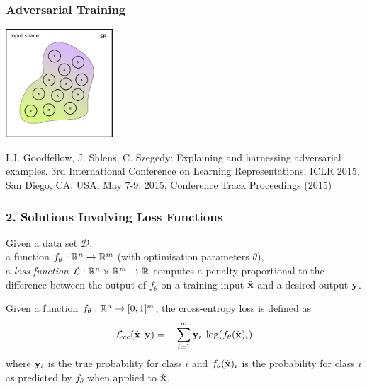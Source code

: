 \documentclass[t,compress,aspectratio=169]{beamer}
\begin{document}
 \begin{frame}[fragile]
  \frametitle{Adversarial Training}


  \vspace{-1em}

\begin{center}

  \includegraphics[width=4cm]{img/SR-vs-CR-3.png}

  \end{center}
   {\scriptsize
   \begin{thebibliography}{99}
        \beamertemplatearticlebibitems
I.J. Goodfellow, J. Shlens, C. Szegedy: Explaining and harnessing adversarial examples. 3rd International Conference on Learning Representations,
ICLR 2015, San Diego, CA, USA, May 7-9, 2015, Conference Track Proceedings (2015)
 \end{thebibliography}}
 \end{frame}


\begin{frame}
  \frametitle{2. Solutions Involving Loss Functions}
    \vspace{-2em}

Given a data set $\mathcal{D} $,\\  a function  ${f_{\theta}: {\mathbb R}^n \rightarrow {\mathbb R}^m}$ (with optimisation parameters $\theta$),\\
	a \emph{loss function} $\mathcal{L}: {\mathbb R}^n \times {\mathbb R}^m \rightarrow \mathbb{R}$ computes a penalty proportional to the difference between the output of $f_{\theta}$ on a training input $\hat{\mathbf{x}}$ and a desired output $\mathbf{y}$.\pause


\begin{example}
	\label{eq:cross-entropy}
	Given a function  ${f_{\theta}: {\mathbb R}^n \rightarrow [0,1]^m}$, the cross-entropy loss is defined as
	\begin{equation}\label{eq:ce}
	\mathcal{L}_{ce}(\hat{\mathbf{x}}, \mathbf{y}) = - \sum_{i=1}^{m} \mathbf{y}_i \; \log(f_{\theta}(\hat{\mathbf{x}})_i)
	\end{equation}
	where $\mathbf{y}_i$ is the true probability for class $i$ and $f_{\theta}(\hat{\mathbf{x}})_i$ is the probability for class $i$ as predicted by $f_{\theta}$ when applied to $\hat{\mathbf{x}}$.
\end{example}

\end{frame}
\end{document}

